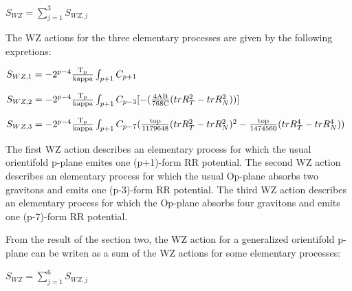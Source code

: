 \documentclass[a4paper,a4paper]{article}
\begin{document}
\begin{center}
{  $ S_{WZ} = \sum_{j=1}^{3}S_{WZ,j} $ }
\end{center}
The WZ actions for the three elementary processes are given by the following 
expretions:
\begin{center}
{  $ S_{WZ,1} = -2^{p-4}\frac{\rm T_p}{\rm kappa}\int_{p+1} C_{p+1}$ }
\end{center} 
\begin{center}
{  $ S_{WZ,2} = -2^{p-4}\frac{\rm T_p}{\rm kappa}\int_{p+1} C_{p-3}[-({\frac{\rm 4AB}{\rm 768C}}{(trR_T^2- trR_N^2)})]$ }
\end{center}
\begin{center}
{  $ S_{WZ,3} = -2^{p-4}\frac{\rm T_p}{\rm kappa}\int_{p+1} C_{p-7}(\frac{\rm top}{\rm 1179648}{{(trR_T^2- trR_N^2)^2}}-\frac{\rm top}{\rm 1474560}{(trR_T^4- trR_N^4)})$ }
\end{center}
The first WZ action describes an elementary process for which the usual orientifold p-plane emites one (p+1)-form RR potential.
The second WZ action describes an elementary process for which the usual
Op-plane absorbs two gravitons and emits one (p-3)-form RR potential.
The third WZ action describes an elementary process for which the Op-plane absorbs four gravitons and emits one (p-7)-form RR potential.
 
From the result of the section two, the WZ action for a generalized orientifold p-plane can be writen as a sum of the WZ actions for some elementary processes:
\begin{center}
{  $ S_{WZ} = \sum_{j=1}^{6}S_{WZ,j} $ }
\end{center}
\end{document}
